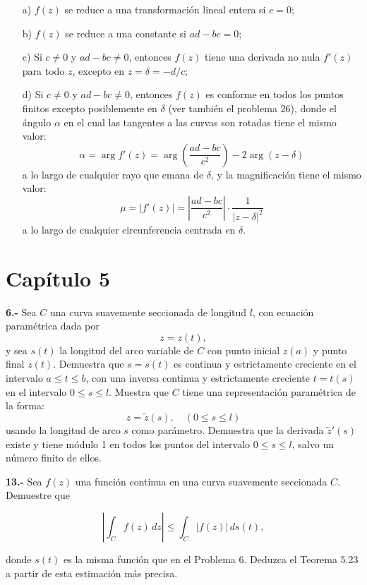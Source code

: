 \documentclass[10pt,a4paper]{book}
\begin{document}
\begin{enumerate}
    \item[a)] \(f(z)\) se reduce a una transformación lineal entera si \(c = 0\);
    \item[b)] \(f(z)\) se reduce a una constante si \(ad - bc = 0\);
    \item[c)] Si \(c \neq 0\) y \(ad - bc \neq 0\), entonces \(f(z)\) tiene una derivada no nula \(f'(z)\) para todo \(z\), excepto en \(z = \delta = -d/c\);
    \item[d)] Si \(c \neq 0\) y \(ad - bc \neq 0\), entonces \(f(z)\) es conforme en todos los puntos finitos excepto posiblemente en \(\delta\) (ver también el problema 26), donde el ángulo \(\alpha\) en el cual las tangentes a las curvas son rotadas tiene el mismo valor:
    \begin{equation}
        \alpha = \arg f'(z) = \arg\left(\frac{ad - bc}{c^2}\right) - 2 \arg(z - \delta)
    \end{equation}
    a lo largo de cualquier rayo que emana de \(\delta\), y la magnificación tiene el mismo valor:
    \begin{equation}
        \mu = |f'(z)| = \left| \frac{ad - bc}{c^2} \right| \cdot \frac{1}{|z - \delta|^2}
    \end{equation}
    a lo largo de cualquier circunferencia centrada en \(\delta\).
\end{enumerate}

\newpage

\section*{Capítulo 5}

\textbf{6.-} Sea \(C\) una curva suavemente seccionada de longitud \(l\), con ecuación paramétrica dada por
\begin{equation}
    z = z(t),
\end{equation}
y sea \(s(t)\) la longitud del arco variable de \(C\) con punto inicial \(z(a)\) y punto final \(z(t)\). Demuestra que \(s = s(t)\) es continua y estrictamente creciente en el intervalo \(a \leq t \leq b\), con una inversa continua y estrictamente creciente \(t = t(s)\) en el intervalo \(0 \leq s \leq l\). Muestra que \(C\) tiene una representación paramétrica de la forma:
\begin{equation}
    z = \tilde{z}(s), \quad (0 \leq s \leq l) \tag{45'}
\end{equation}
usando la longitud de arco \(s\) como parámetro. Demuestra que la derivada \(\tilde{z}'(s)\) existe y tiene módulo 1 en todos los puntos del intervalo \(0 \leq s \leq l\), salvo un número finito de ellos.

\newpage

\textbf{13.- }Sea \( f(z) \) una función continua en una curva suavemente seccionada \( C \). Demuestre que

\[
\left| \int_C f(z) \, dz \right| \leq \int_C |f(z)| \, ds(t),
\]

donde \( s(t) \) es la misma función que en el Problema 6. Deduzca el Teorema 5.23 a partir de esta estimación más precisa.
\end{document}
